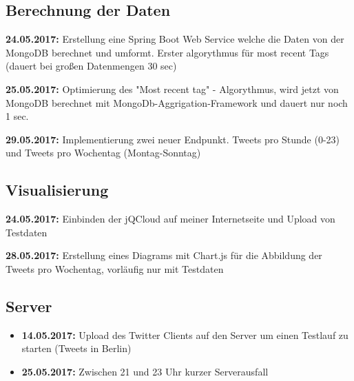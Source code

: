 \documentclass[12pt, 
	a4paper, 
	oneside, 
	leqno]{scrreprt}
\begin{document}
\subsection*{Berechnung der Daten}
  \item \textbf{24.05.2017:} Erstellung eine Spring Boot Web Service welche die Daten von der MongoDB berechnet und umformt. Erster algorythmus für most recent Tags (dauert bei großen Datenmengen 30 sec)
  \item \textbf{25.05.2017:} Optimierung des "Most recent tag" - Algorythmus, wird jetzt von MongoDB berechnet mit MongoDb-Aggrigation-Framework und dauert nur noch 1 sec.
  \item \textbf{29.05.2017:} Implementierung zwei neuer Endpunkt. Tweets pro Stunde (0-23) und Tweets pro Wochentag (Montag-Sonntag)

\subsection*{Visualisierung}
  \item \textbf{24.05.2017:} Einbinden der jQCloud auf meiner Internetseite und Upload von Testdaten
  \item \textbf{28.05.2017:} Erstellung eines Diagrams mit Chart.js für die Abbildung der Tweets pro Wochentag, vorläufig nur mit Testdaten

\subsection*{Server}

\begin{itemize}
  \item \textbf{14.05.2017:} Upload des Twitter Clients auf den Server um einen Testlauf zu starten (Tweets in Berlin)
  \item \textbf{25.05.2017:} Zwischen 21 und 23 Uhr kurzer Serverausfall
\end{itemize}
\end{document}
